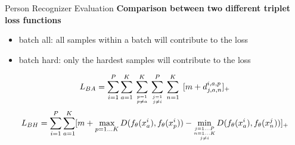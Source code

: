 \documentclass{beamer}
\begin{document}
\begin{frame}{Person Recognizer Evaluation}
    \textbf{Comparison between two different triplet loss functions}
        
    {\scriptsize \begin{itemize}
        \item batch all: all samples within a batch will contribute to the loss
        \item batch hard: only the hardest samples will contribute to the loss
    \end{itemize}}
    
    \begin{equation}
    \label{eq:batch-all}
    \tiny
    L_{BA} = \sum_{i=1}^{P} \sum_{a=1}^{K}  \:
    \sum_{\substack{p=1\\ p\neq a}}^{K} \:
    \sum_{\substack{j=1\\ j \neq i}}^{P} \:
    \sum_{n=1}^{K} \:\:
    [m + d_{j, a, n}^{i, a, p}]_+
    \end{equation}
    \begin{equation}
    \label{eq:batch-hard}
    \tiny
    L_{BH} = \sum_{i=1}^{P} \sum_{a=1}^{K}
    [
    m + \max_{p=1...K} D(f_{\theta}(x_{a}^i), f_{\theta}(x_{p}^i))
    - \min_{\substack{j=1...P\\ n=1...K\\ j\neq i}}
    D(f_{\theta}(x_{a}^i), f_{\theta}(x_{n}^j))
    ]_+
    \end{equation}
    
    \begin{table}[]
        \centering
        \caption{Validation result on the model trained with Market1501 dataset 
            guided by two different loss functions.}
    \end{table}


\end{frame}
\end{document}
